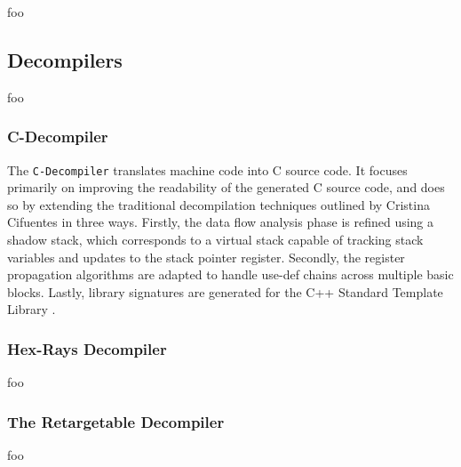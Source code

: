 
foo


\subsection{Decompilers}

foo


\subsubsection{C-Decompiler}

The \texttt{C-Decompiler} translates machine code into C source code. It focuses primarily on improving the readability of the generated C source code, and does so by extending the traditional decompilation techniques outlined by Cristina Cifuentes in three ways. Firstly, the data flow analysis phase is refined using a shadow stack, which corresponds to a virtual stack capable of tracking stack variables and updates to the stack pointer register. Secondly, the register propagation algorithms are adapted to handle use-def chains across multiple basic blocks. Lastly, library signatures are generated for the C++ Standard Template Library \cite{readable_decomp}.


\subsubsection{Hex-Rays Decompiler}

foo

\cite{hexrays}


\subsubsection{The Retargetable Decompiler}
\label{sec:retargetable_decompiler}


foo

\cite{retargetable_decomp}
